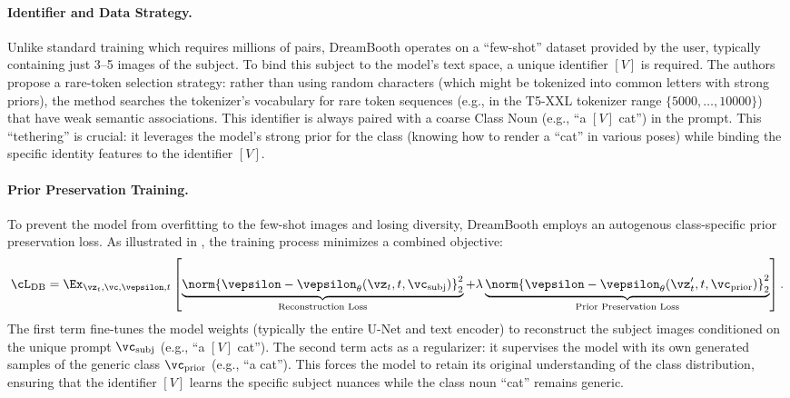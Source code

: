 \documentclass[../../book-main.tex]{subfiles}
\begin{document}
\paragraph{Identifier and Data Strategy.}
Unlike standard training which requires millions of pairs, DreamBooth operates on a ``few-shot'' dataset provided by the user, typically containing just 3--5 images of the subject.
To bind this subject to the model's text space, a unique identifier \([V]\) is required.
The authors propose a rare-token selection strategy: rather than using random characters (which might be tokenized into common letters with strong priors), the method searches the tokenizer's vocabulary for rare token sequences (e.g., in the T5-XXL tokenizer range \(\{5000, \dots, 10000\}\)) that have weak semantic associations.
This identifier is always paired with a coarse Class Noun (e.g., ``a \([V]\) cat'') in the prompt.
This ``tethering'' is crucial: it leverages the model's strong prior for the class (knowing how to render a ``cat'' in various poses) while binding the specific identity features to the identifier \([V]\).

\paragraph{Prior Preservation Training.}
To prevent the model from overfitting to the few-shot images and losing diversity, DreamBooth employs an autogenous class-specific prior preservation loss.
As illustrated in , the training process minimizes a combined objective:
\begin{equation}
    \cL_{\text{DB}} = \Ex_{\vz_{t}, \vc, \vepsilon, t} \left[ \underbrace{\norm{\vepsilon - \vepsilon_{\theta}(\vz_{t}, t, \vc_{\text{subj}})}_{2}^{2}}_{\text{Reconstruction Loss}} + \lambda \underbrace{\norm{\vepsilon - \vepsilon_{\theta}(\vz'_{t}, t, \vc_{\text{prior}})}_{2}^{2}}_{\text{Prior Preservation Loss}} \right] .
\label{eq:dreambooth}
\end{equation}
The first term fine-tunes the model weights (typically the entire U-Net and text encoder) to reconstruct the subject images conditioned on the unique prompt \(\vc_{\text{subj}}\) (e.g., ``a \([V]\) cat'').
The second term acts as a regularizer: it supervises the model with its own generated samples of the generic class \(\vc_{\text{prior}}\) (e.g., ``a cat'').
This forces the model to retain its original understanding of the class distribution, ensuring that the identifier \([V]\) learns the specific subject nuances while the class noun ``cat'' remains generic.
\end{document}
